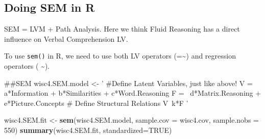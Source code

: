 \documentclass[]{book}
\newenvironment{Shaded}{\begin{snugshade}}{\end{snugshade}}
\newcommand{\KeywordTok}[1]{\textcolor[rgb]{0.13,0.29,0.53}{\textbf{#1}}}
\newcommand{\DataTypeTok}[1]{\textcolor[rgb]{0.13,0.29,0.53}{#1}}
\newcommand{\DecValTok}[1]{\textcolor[rgb]{0.00,0.00,0.81}{#1}}
\newcommand{\StringTok}[1]{\textcolor[rgb]{0.31,0.60,0.02}{#1}}
\newcommand{\OtherTok}[1]{\textcolor[rgb]{0.56,0.35,0.01}{#1}}
\newcommand{\NormalTok}[1]{#1}
\theoremstyle{definition}
\theoremstyle{definition}
\theoremstyle{definition}
\theoremstyle{remark}
\begin{document}
\subsection{Doing SEM in R}\label{doing-sem-in-r}

SEM = LVM + Path Analysis. Here we think Fluid Reasoning has a direct
influence on Verbal Comprehension LV.

To use \texttt{sem()} in R, we need to use both LV operators
(=\textasciitilde{}) and regression operators ( \textasciitilde{}).

\begin{Shaded}
\begin{Highlighting}[]
\NormalTok{##SEM }
\NormalTok{wisc4.SEM.model <-}\StringTok{ '}
\StringTok{#Define Latent Variables, just like above!}
\StringTok{V =~ a*Information + b*Similarities + c*Word.Reasoning}
\StringTok{F =~ d*Matrix.Reasoning + e*Picture.Concepts}
\StringTok{# Define Structural Relations}
\StringTok{V~k*F}
\StringTok{'} 

\NormalTok{wisc4.SEM.fit <-}\StringTok{ }\KeywordTok{sem}\NormalTok{(wisc4.SEM.model, }\DataTypeTok{sample.cov =}\NormalTok{ wisc4.cov, }\DataTypeTok{sample.nobs =} \DecValTok{550}\NormalTok{)}
\KeywordTok{summary}\NormalTok{(wisc4.SEM.fit, }\DataTypeTok{standardized=}\OtherTok{TRUE}\NormalTok{)}
\end{Highlighting}
\end{Shaded}
\end{document}
